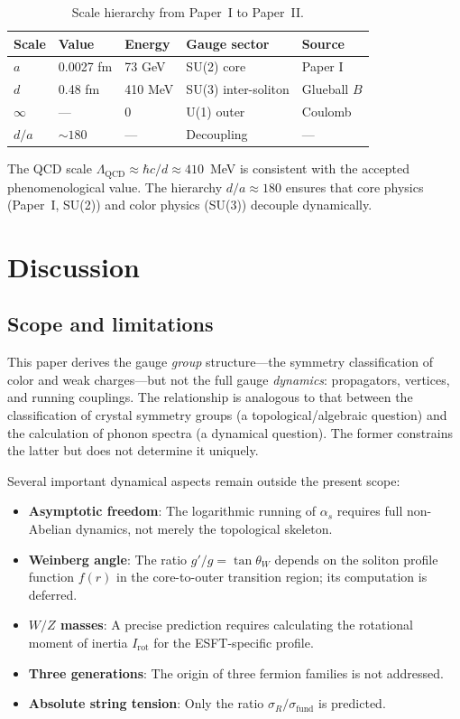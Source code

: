 \documentclass[a4paper,12pt]{article}
\begin{document}
\begin{table}[t]
\centering
\caption{Scale hierarchy from Paper~I to Paper~II.}
\label{tab:scales}
\begin{tabular}{@{}lllll@{}}
\toprule
Scale & Value & Energy & Gauge sector & Source \\
\midrule
$a$ & 0.0027 fm & 73 GeV & SU(2) core & Paper I \\
$d$ & 0.48 fm & 410 MeV & SU(3) inter-soliton & Glueball $B$ \\
$\infty$ & --- & 0 & U(1) outer & Coulomb \\
$d/a$ & $\sim\!180$ & --- & Decoupling & --- \\
\bottomrule
\end{tabular}
\end{table}

The QCD scale $\Lambda_{\mathrm{QCD}} \approx \hbar c/d \approx
410$~MeV is consistent with the accepted phenomenological value.
The hierarchy $d/a \approx 180$ ensures that core physics (Paper~I,
SU(2)) and color physics (SU(3)) decouple dynamically.


\section{Discussion}
\label{sec:discussion}

\subsection{Scope and limitations}

This paper derives the gauge \emph{group} structure---the symmetry
classification of color and weak charges---but not the full gauge
\emph{dynamics}: propagators, vertices, and running couplings.
The relationship is analogous to that between the classification
of crystal symmetry groups (a topological/algebraic question)
and the calculation of phonon spectra (a dynamical question).
The former constrains the latter but does not determine it uniquely.

Several important dynamical aspects remain outside the present scope:
\begin{itemize}
 \item \textbf{Asymptotic freedom}: The logarithmic running of
 $\alpha_s$ requires full non-Abelian dynamics, not merely the
 topological skeleton.
 \item \textbf{Weinberg angle}: The ratio $g'/g = \tan\theta_W$
 depends on the soliton profile function $f(r)$ in the core-to-outer
 transition region; its computation is deferred.
 \item \textbf{$W/Z$ masses}: A precise prediction requires
 calculating the rotational moment of inertia $I_{\mathrm{rot}}$
 for the ESFT-specific profile.
 \item \textbf{Three generations}: The origin of three fermion
 families is not addressed.
 \item \textbf{Absolute string tension}: Only the ratio
 $\sigma_R/\sigma_{\mathrm{fund}}$ is predicted.
\end{itemize}
\end{document}
